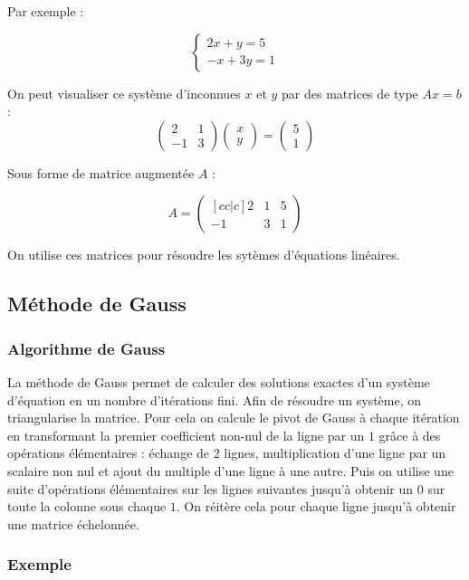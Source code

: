 \documentclass{article}
\begin{document}
Par exemple :

\[\begin{cases}
  2x + y = 5 \\
  -x + 3y = 1
 \end{cases}\]

On peut visualiser ce système d'inconnues $x$ et $y$ par des matrices de type $Ax=b$ :
\[\begin{pmatrix}
  2  & 1 \\
  -1 & 3
 \end{pmatrix}
 \begin{pmatrix}
  x \\
  y
 \end{pmatrix}
 =
 \begin{pmatrix}
  5 \\
  1
 \end{pmatrix}\]

Sous forme de matrice augmentée $A$ :

\[ A =
 \begin{pmatrix}[cc|c]
  2  & 1 & 5 \\
  -1 & 3 & 1
 \end{pmatrix}\]

On utilise ces matrices pour résoudre les sytèmes d'équations linéaires.

\subsection{Méthode de Gauss}

\subsubsection{Algorithme de Gauss}

La méthode de Gauss permet de calculer des solutions exactes d'un système d'équation en un nombre d'itérations fini.
Afin de résoudre un système, on triangularise la matrice. Pour cela on calcule le pivot de Gauss à chaque itération en transformant la premier coefficient non-nul de la ligne par un $1$ grâce à des opérations élémentaires : échange de 2 lignes, multiplication d'une ligne par un scalaire non nul et ajout du multiple d'une ligne à une autre.
Puis on utilise une suite d'opérations élémentaires sur les lignes suivantes jusqu'à obtenir un $0$ sur toute la colonne sous chaque $1$.
On réitère cela pour chaque ligne jusqu'à obtenir une matrice échelonnée.

\subsubsection{Exemple}
\end{document}
